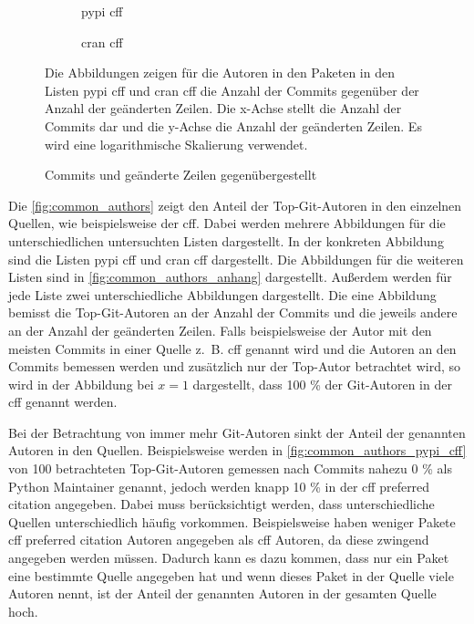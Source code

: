 \begin{figure}
    \begin{subfigure}{.5\textwidth}
        \centering
        
        \caption{\gls{pypi} \gls{cff}}
        \label{fig:commits_vs_changed_lines_pypi_cff}
    \end{subfigure}%
    \begin{subfigure}{.5\textwidth}
        \centering
        
        \caption{\gls{cran} \gls{cff}}
        \label{fig:commits_vs_changed_lines_cran_cff}
    \end{subfigure}
    \caption{Commits und geänderte Zeilen gegenübergestellt}
    \label{fig:commits_vs_changed_lines}
    \small
    Die Abbildungen zeigen für die Autoren in den Paketen in den Listen \gls{pypi} \gls{cff} und \gls{cran} \gls{cff} die Anzahl der Commits gegenüber der Anzahl der geänderten Zeilen. Die x-Achse stellt die Anzahl der Commits dar und die y-Achse die Anzahl der geänderten Zeilen. Es wird eine logarithmische Skalierung verwendet.
\end{figure}

Die \autoref{fig:common_authors} zeigt den Anteil der Top-Git-Autoren in den einzelnen Quellen, wie beispielsweise der \gls{cff}.
Dabei werden mehrere Abbildungen für die unterschiedlichen untersuchten Listen dargestellt.
In der konkreten Abbildung sind die Listen \gls{pypi} \gls{cff} und \gls{cran} \gls{cff} dargestellt.
Die Abbildungen für die weiteren Listen sind in \autoref{fig:common_authors_anhang} dargestellt.
Außerdem werden für jede Liste zwei unterschiedliche Abbildungen dargestellt.
Die eine Abbildung bemisst die Top-Git-Autoren an der Anzahl der Commits und die jeweils andere an der Anzahl der geänderten Zeilen.
Falls beispielsweise der Autor mit den meisten Commits in einer Quelle z. B. \gls{cff} genannt wird und die Autoren an den Commits bemessen werden und zusätzlich nur der Top-Autor betrachtet wird, so wird in der Abbildung bei $x=1$ dargestellt, dass 100 \% der Git-Autoren in der \gls{cff} genannt werden.

Bei der Betrachtung von immer mehr Git-Autoren sinkt der Anteil der genannten Autoren in den Quellen.
Beispielsweise werden in \autoref{fig:common_authors_pypi_cff} von 100 betrachteten Top-Git-Autoren gemessen nach Commits nahezu 0 \% als Python Maintainer genannt, jedoch werden knapp 10 \% in der \gls{cff} preferred citation angegeben.
Dabei muss berücksichtigt werden, dass unterschiedliche Quellen unterschiedlich häufig vorkommen.
Beispielsweise haben weniger Pakete \gls{cff} preferred citation Autoren angegeben als \gls{cff} Autoren, da diese zwingend angegeben werden müssen.
Dadurch kann es dazu kommen, dass nur ein Paket eine bestimmte Quelle angegeben hat und wenn dieses Paket in der Quelle viele Autoren nennt, ist der Anteil der genannten Autoren in der gesamten Quelle hoch.

